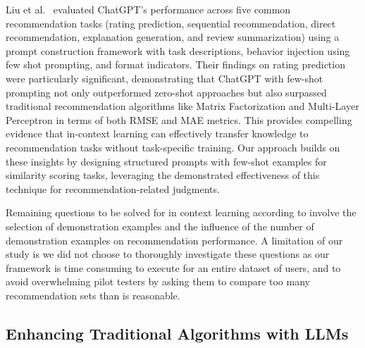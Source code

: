 \documentclass[sigconf]{acmart}
\begin{document}
Liu et al.~\cite{liu2023chatgpt} evaluated ChatGPT's performance across five common recommendation tasks (rating prediction, sequential recommendation, direct recommendation, explanation generation, and review summarization) using a prompt construction framework with task descriptions, behavior injection using few shot prompting, and format indicators. Their findings on rating prediction were particularly significant, demonstrating that ChatGPT with few-shot prompting not only outperformed zero-shot approaches but also surpassed traditional recommendation algorithms like Matrix Factorization and Multi-Layer Perceptron in terms of both RMSE and MAE metrics. This provides compelling evidence that in-context learning can effectively transfer knowledge to recommendation tasks without task-specific training. Our approach builds on these insights by designing structured prompts with few-shot examples for similarity scoring tasks, leveraging the demonstrated effectiveness of this technique for recommendation-related judgments.

Remaining questions to be solved for in context learning according to \cite{wu2024survey} involve the selection of demonstration examples and the influence of the number of demonstration examples on recommendation performance. A limitation of our study is we did not choose to thoroughly investigate these questions as our framework is time consuming to execute for an entire dataset of users, and to avoid overwhelming pilot testers by asking them to compare too many recommendation sets than is reasonable.

\subsection{Enhancing Traditional Algorithms with LLMs}
\end{document}
